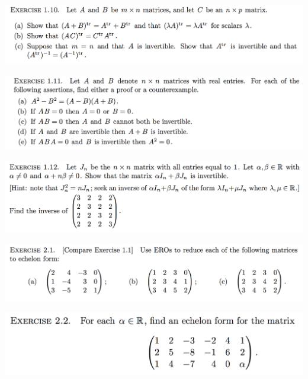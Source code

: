 \documentclass[12pt]{article}
\begin{document}
\begin{mdframed}
\includegraphics[width=400pt]{img/oxford-prelims-M1-linear-algebra-1-10.png}
\end{mdframed}

\begin{mdframed}
\includegraphics[width=400pt]{img/oxford-prelims-M1-linear-algebra-1-11.png}
\end{mdframed}

\begin{mdframed}
\includegraphics[width=400pt]{img/oxford-prelims-M1-linear-algebra-1-12.png}
\end{mdframed}

\begin{mdframed}
\includegraphics[width=400pt]{img/oxford-prelims-M1-linear-algebra-2-1.png}
\end{mdframed}

\begin{mdframed}
\includegraphics[width=400pt]{img/oxford-prelims-M1-linear-algebra-2-2.png}
\end{mdframed}
\end{document}
